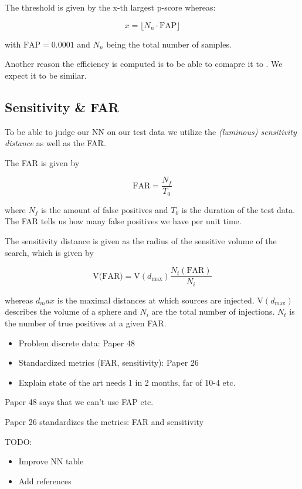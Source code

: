 The threshold is given by the x-th largest p-score whereas:

\begin{equation}
  x = \lfloor N_n \cdot \text{FAP} \rfloor
\end{equation}

with $\text{FAP} = 0.0001$ and $N_n$ being the total number of samples.

Another reason the efficiency is computed is to be able to comapre it to
\cite{PhysRevD.105.043002}. We expect it to be similar.

\subsection{Sensitivity \& FAR}
To be able to judge our NN on our test data we utilize the
\textit{(luminous) sensitivity distance} as well as the FAR.

The FAR is given by \cite{PhysRevD.105.043002}

\begin{equation}
  \text{FAR} = \frac{N_f}{T_0}
\end{equation}

where $N_f$ is the amount of false positives and $T_0$ is the duration of the
test data. The FAR tells us how many false positives we have per unit time.

The sensitivity distance is given as the radius of the sensitive volume of
the search, which is given by \cite{PhysRevD.105.043002}

\begin{equation}
  \text{V(FAR)} = \text{V}(d_{\text{max}})\frac{N_t(\text{FAR})}{N_i}
\end{equation}

whereas $d_max$ is the maximal distances at which sources are injected.
$\text{V}(d_{\text{max}})$ describes the volume of a sphere and $N_i$ are the
total number of injections. $N_t$ is the number of true positives at a given
FAR.

\begin{itemize}
  \item Problem discrete data: Paper 48
  \item Standardized metrics (FAR, sensitivity): Paper 26
  \item Explain state of the art needs 1 in 2 months, far of 10-4 etc.
\end{itemize}
Paper 48 says that we can't use FAP etc.

Paper 26 standardizes the metrics: FAR and sensitivity

TODO:
\begin{itemize}
  \item Improve NN table
  \item Add references
\end{itemize}
